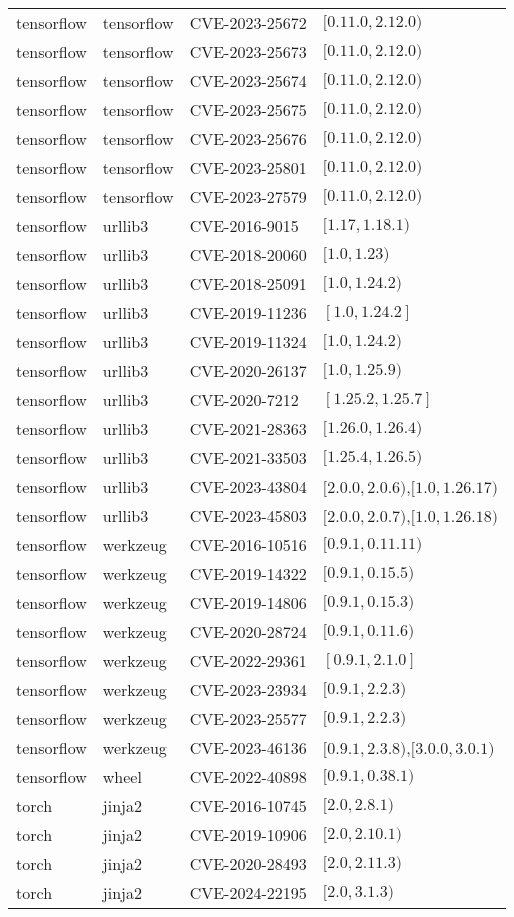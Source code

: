\begin{tabular}{llll}
tensorflow & tensorflow & CVE-2023-25672 & $[0.11.0,2.12.0)$ \\
tensorflow & tensorflow & CVE-2023-25673 & $[0.11.0,2.12.0)$ \\
tensorflow & tensorflow & CVE-2023-25674 & $[0.11.0,2.12.0)$ \\
tensorflow & tensorflow & CVE-2023-25675 & $[0.11.0,2.12.0)$ \\
tensorflow & tensorflow & CVE-2023-25676 & $[0.11.0,2.12.0)$ \\
tensorflow & tensorflow & CVE-2023-25801 & $[0.11.0,2.12.0)$ \\
tensorflow & tensorflow & CVE-2023-27579 & $[0.11.0,2.12.0)$ \\
tensorflow & urllib3 & CVE-2016-9015 & $[1.17,1.18.1)$ \\
tensorflow & urllib3 & CVE-2018-20060 & $[1.0,1.23)$ \\
tensorflow & urllib3 & CVE-2018-25091 & $[1.0,1.24.2)$ \\
tensorflow & urllib3 & CVE-2019-11236 & $[1.0,1.24.2]$ \\
tensorflow & urllib3 & CVE-2019-11324 & $[1.0,1.24.2)$ \\
tensorflow & urllib3 & CVE-2020-26137 & $[1.0,1.25.9)$ \\
tensorflow & urllib3 & CVE-2020-7212 & $[1.25.2,1.25.7]$ \\
tensorflow & urllib3 & CVE-2021-28363 & $[1.26.0,1.26.4)$ \\
tensorflow & urllib3 & CVE-2021-33503 & $[1.25.4,1.26.5)$ \\
tensorflow & urllib3 & CVE-2023-43804 & $[2.0.0,2.0.6)$,$[1.0,1.26.17)$ \\
tensorflow & urllib3 & CVE-2023-45803 & $[2.0.0,2.0.7)$,$[1.0,1.26.18)$ \\
tensorflow & werkzeug & CVE-2016-10516 & $[0.9.1,0.11.11)$ \\
tensorflow & werkzeug & CVE-2019-14322 & $[0.9.1,0.15.5)$ \\
tensorflow & werkzeug & CVE-2019-14806 & $[0.9.1,0.15.3)$ \\
tensorflow & werkzeug & CVE-2020-28724 & $[0.9.1,0.11.6)$ \\
tensorflow & werkzeug & CVE-2022-29361 & $[0.9.1,2.1.0]$ \\
tensorflow & werkzeug & CVE-2023-23934 & $[0.9.1,2.2.3)$ \\
tensorflow & werkzeug & CVE-2023-25577 & $[0.9.1,2.2.3)$ \\
tensorflow & werkzeug & CVE-2023-46136 & $[0.9.1,2.3.8)$,$[3.0.0,3.0.1)$ \\
tensorflow & wheel & CVE-2022-40898 & $[0.9.1,0.38.1)$ \\
torch & jinja2 & CVE-2016-10745 & $[2.0,2.8.1)$ \\
torch & jinja2 & CVE-2019-10906 & $[2.0,2.10.1)$ \\
torch & jinja2 & CVE-2020-28493 & $[2.0,2.11.3)$ \\
torch & jinja2 & CVE-2024-22195 & $[2.0,3.1.3)$ \\
\bottomrule
\end{tabular}
